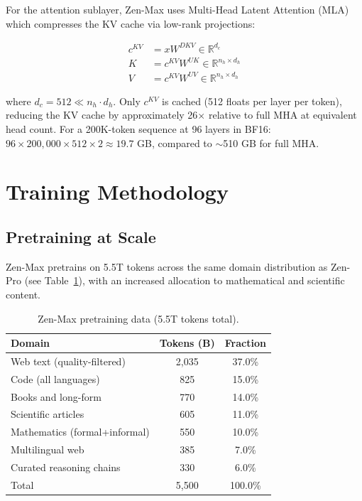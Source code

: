 \documentclass[11pt,a4paper]{article}
\begin{document}
For the attention sublayer, Zen-Max uses Multi-Head Latent Attention (MLA) \cite{liu2024deepseekv2}
which compresses the KV cache via low-rank projections:

\begin{align}
  c^{KV} &= x W^{DKV} \in \mathbb{R}^{d_c} \\
  K &= c^{KV} W^{UK} \in \mathbb{R}^{n_h \times d_h} \\
  V &= c^{KV} W^{UV} \in \mathbb{R}^{n_h \times d_h}
\end{align}

where $d_c = 512 \ll n_h \cdot d_h$. Only $c^{KV}$ is cached (512 floats per layer per
token), reducing the KV cache by approximately 26$\times$ relative to full MHA at equivalent
head count. For a 200K-token sequence at 96 layers in BF16: $96 \times 200{,}000 \times 512
\times 2 \approx 19.7$ GB, compared to $\sim$510 GB for full MHA.

\section{Training Methodology}

\subsection{Pretraining at Scale}

Zen-Max pretrains on 5.5T tokens across the same domain distribution as Zen-Pro (see
Table~\ref{tab:data}), with an increased allocation to mathematical and scientific content.

\begin{table}[H]
\centering
\caption{Zen-Max pretraining data (5.5T tokens total).}
\label{tab:data}
\begin{tabular}{lcc}
\toprule
\textbf{Domain} & \textbf{Tokens (B)} & \textbf{Fraction} \\
\midrule
Web text (quality-filtered)   & 2{,}035 & 37.0\% \\
Code (all languages)          &   825 & 15.0\% \\
Books and long-form           &   770 & 14.0\% \\
Scientific articles           &   605 & 11.0\% \\
Mathematics (formal+informal) &   550 & 10.0\% \\
Multilingual web              &   385 &  7.0\% \\
Curated reasoning chains      &   330 &  6.0\% \\
\midrule
Total                         & 5{,}500 & 100.0\% \\
\bottomrule
\end{tabular}
\end{table}
\end{document}
